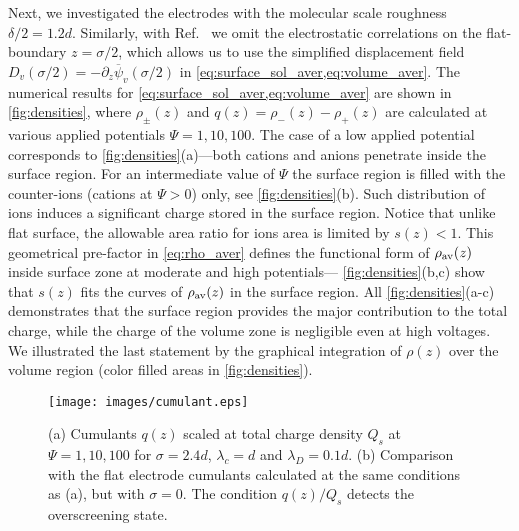 Next, we investigated the electrodes with the molecular scale roughness $\delta/2=1.2d$.
Similarly, with Ref.~\cite{bazant2011double} we omit the electrostatic correlations on the flat-boundary $z=\sigma/2$, which allows us to use the simplified displacement field  $D_v(\sigma/2)=-\partial_z\overline{\psi}_v(\sigma/2)$ in \cref{eq:surface_sol_aver,eq:volume_aver}. The numerical results for \cref{eq:surface_sol_aver,eq:volume_aver} are shown in 
\cref{fig:densities}, where $\rho_\pm(z)$ and $q(z)=\rho_-(z)-\rho_+(z)$ are calculated at various applied potentials $\Psi=1, 10, 100$. 
The case of a low applied potential corresponds to \cref{fig:densities}(a)---both cations and anions penetrate inside the surface region. For an intermediate value of $\Psi$ the surface region is filled with the counter-ions (cations at $\Psi>0$) only, see \cref{fig:densities}(b). Such distribution of ions induces a significant charge stored in the surface region. Notice that unlike flat surface, the allowable area ratio for ions area is limited by $s(z)<1$. This geometrical pre-factor in \cref{eq:rho_aver} defines the functional form of $\rho_\text{av}(z)$ inside surface zone at moderate and high potentials--- \cref{fig:densities}(b,c) show that $s(z)$ fits the curves of $\rho_\text{av}(z)$ in the surface region. 
All \cref{fig:densities}(a-c) demonstrates that the surface region provides the major contribution to the total charge, while the charge of the volume zone is negligible even at high voltages.
We illustrated the last statement by the graphical integration of $\rho(z)$ over the volume region (color filled areas in \cref{fig:densities}). 

\begin{figure}
    \centering
    \texttt{[image: images/cumulant.eps]}
    \caption{(a) Cumulants $q(z)$ scaled at total charge density $Q_s$ at $\Psi=1, 10, 100$ for $\sigma=2.4d$, $\lambda_c=d$ and $\lambda_D=0.1d$.
    (b) Comparison with the flat electrode cumulants calculated at the same conditions as (a), but with $\sigma=0$. The condition $q(z)/Q_s$ detects the overscreening state. 
    }
    \label{fig:cumulant}
\end{figure}

